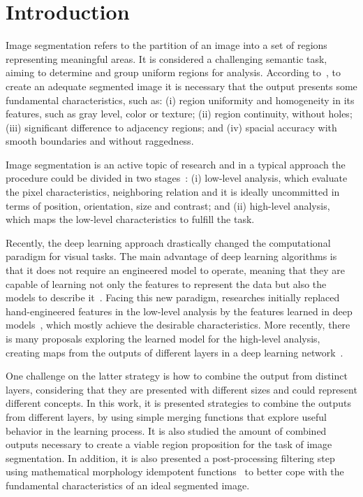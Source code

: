 \section{Introduction}
\label{sec:intro}

Image segmentation refers to the partition of an image into a set of regions representing  meaningful areas. It is considered a challenging semantic task, aiming to determine and group uniform regions for analysis. According to~\cite{DOMINGUEZ}, to create an adequate segmented image it is necessary that the output presents some fundamental characteristics, such as: (i) region uniformity and homogeneity in  its features, such as gray level, color or texture; (ii) region continuity, without holes; (iii) significant difference to adjacency regions; and (iv) spacial accuracy with smooth boundaries and without raggedness. 

Image segmentation is an active topic of research and in a typical approach the procedure could be divided in two stages~\cite{guigues06}: (i) low-level analysis, which evaluate the pixel characteristics, neighboring relation and it is ideally uncommitted in terms of position, orientation,
size and contrast; and (ii) high-level analysis, which maps the low-level characteristics to fulfill the task.  

Recently, the deep learning approach drastically changed the computational paradigm for visual tasks. The main advantage of deep learning algorithms is that it does not require an engineered model to operate, meaning that they are capable of learning not only the features to represent the data but also the models to describe it~\cite{goodfellow16}. Facing this new paradigm, researches initially replaced  hand-engineered features in the low-level analysis by the features learned in deep models~\cite{farabet2013,simonyan2014,lee2015}, which mostly achieve the desirable characteristics. More recently, there is many proposals exploring the learned model for the high-level analysis, creating maps from the outputs of different layers in a deep learning network~\cite{xie2017,cheng2016,maninis2017,liu2017}. 

One challenge on the latter strategy is how to combine the output from distinct layers, considering that they are presented with different sizes and could represent different concepts. In this work, it is presented strategies to combine the outputs from different layers, by using simple merging functions that explore useful behavior in the learning process. It is also studied the amount of combined outputs necessary to create a viable region proposition for the task of image segmentation. In addition, it is also presented a post-processing filtering step using mathematical morphology idempotent functions~\cite{najman13} to better cope with the fundamental characteristics of an ideal segmented image.  

